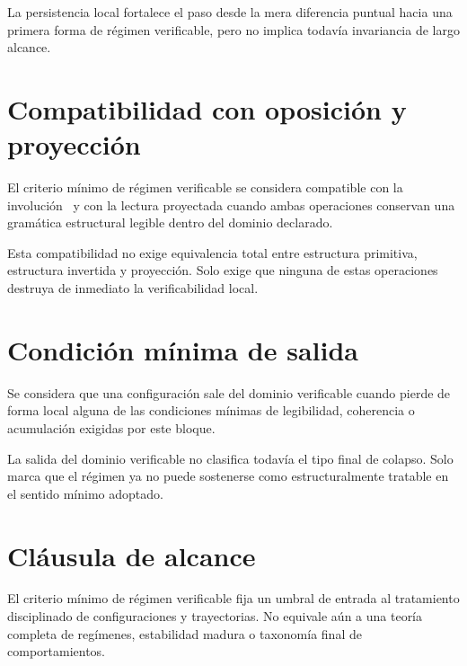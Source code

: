 \begin{observation}
La persistencia local fortalece el paso desde la mera diferencia puntual hacia una primera forma de régimen verificable, pero no implica todavía invariancia de largo alcance.
\end{observation}

\section{Compatibilidad con oposición y proyección}
\begin{definition}
El criterio mínimo de régimen verificable se considera compatible con la involución \Iop\ y con la lectura proyectada cuando ambas operaciones conservan una gramática estructural legible dentro del dominio declarado.
\end{definition}

\begin{observation}
Esta compatibilidad no exige equivalencia total entre estructura primitiva, estructura invertida y proyección. Solo exige que ninguna de estas operaciones destruya de inmediato la verificabilidad local.
\end{observation}

\section{Condición mínima de salida}
\begin{definition}
Se considera que una configuración sale del dominio verificable cuando pierde de forma local alguna de las condiciones mínimas de legibilidad, coherencia o acumulación exigidas por este bloque.
\end{definition}

\begin{observation}
La salida del dominio verificable no clasifica todavía el tipo final de colapso. Solo marca que el régimen ya no puede sostenerse como estructuralmente tratable en el sentido mínimo adoptado.
\end{observation}

\section{Cláusula de alcance}
\begin{observation}
El criterio mínimo de régimen verificable fija un umbral de entrada al tratamiento disciplinado de configuraciones y trayectorias. No equivale aún a una teoría completa de regímenes, estabilidad madura o taxonomía final de comportamientos.
\end{observation}

